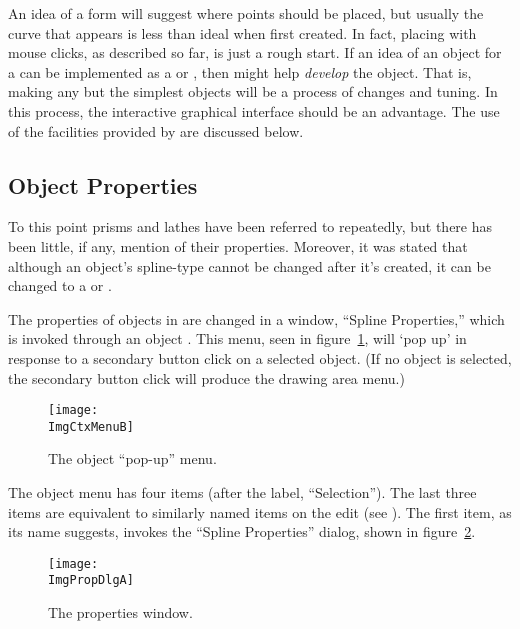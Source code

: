 	An idea of a form will
	suggest where points should be
	placed, but usually the curve that appears is less than
	ideal when first created. In fact, placing
	 with mouse clicks, as described
	so far, is just a rough start. If an idea of an
	object for a \IXpov{}  can be
	implemented as a \IXpov{} \IXprism{} or
	\IXlathe{}, then \IXpkg{} might help
	\emph{develop} the object. That is, making
	any but the simplest objects will be a process
	of changes and tuning. In this process, the
	interactive graphical interface should be
	an advantage. The use of the facilities
	provided by \IXpkg{} are discussed below.
	
		\subsection{Object Properties}%
		\label{ssec:object_props}
		To this point prisms and lathes have been
		referred to repeatedly, but there has been
		little, if any, mention of their properties.
		Moreover, it was stated that although an
		object's spline-type cannot be changed after
		it's created, it can be changed to a \IXprism{}
		or \IXlathe{}.
		
		The properties of objects in \IXpkg{}
		are changed in a  window,
		``Spline Properties,'' which is invoked
		through an object . This menu,
		seen in figure~\ref{fig:object_popup_menu},
		will `pop up' in response to a secondary
		button click on a selected object.
		(If no object is selected, the secondary
		button click will produce the drawing area
		menu.)
		
		\begin{figure}[htb!]
		\centering
		\texttt{[image: \\ImgCtxMenuB]}
		\caption{The object ``pop-up'' menu.}
		\label{fig:object_popup_menu}
		\end{figure}

		The object menu has four items (after the label,
		``Selection''). The last three items are
		equivalent to similarly named items on the
		edit  (see ).
		The first item, as its name suggests, invokes
		the ``Spline Properties'' dialog, shown in
		figure~\ref{fig:props_dlg}.

		\begin{figure}[htb!]
		\centering
		\texttt{[image: \\ImgPropDlgA]}
		\caption{The properties window.}
		\label{fig:props_dlg}
		\end{figure}
		

